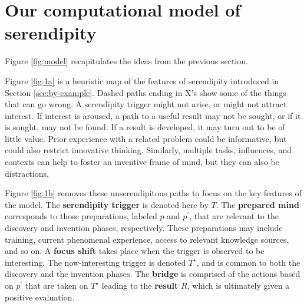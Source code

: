 \section{Our computational model of serendipity} \label{sec:our-model}

Figure \ref{fig:model} recapitulates the ideas from the previous
section.

Figure \ref{fig:1a} is a heuristic map of the features of serendipity
introduced in Section \ref{sec:by-example}.
%
Dashed paths ending in X's show some of the things that can go wrong.
A serendipity trigger might not arise, or might not attract interest.
If interest is aroused, a path to a useful result may not be sought,
or if it is sought, may not be found.  If a result is developed, it
may turn out to be of little value.  Prior experience with a related
problem could be informative, but could also restrict innovative
thinking.  Similarly, multiple tasks, influences, and contexts can
help to foster an inventive frame of mind, but they can also be
distractions.

Figure \ref{fig:1b} removes these unserendipitous paths to focus on
the key features of the model.
%
The \textbf{serendipity trigger} is denoted here by $T$.  
%
The \textbf{prepared mind} corresponds to those preparations, labeled
$p$ and $p^{\prime}$, that are relevant to the discovery and invention
phases, respectively.  These preparations may include training,
current phenomenal experience, access to relevant knowledge sources,
and so on.
%
A \textbf{focus shift} takes place when the trigger is observed to be
interesting.  The now-interesting trigger is denoted $T^\star$, and is
common to both the discovery and the invention phases.
%
%
The \textbf{bridge} is comprised of the actions based on $p^{\prime}$
that are taken on $T^\star$ leading to the \textbf{result} $R$, which is ultimately given a positive evaluation.

